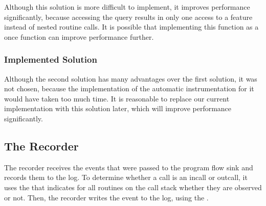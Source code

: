 Although this solution is more difficult to implement, it improves performance significantly, because accessing the query results in only one access to a feature instead of nested routine calls. It is possible that implementing this function as a once function can improve performance further.


\subsubsection {Implemented Solution}
Although the second solution has many advantages over the first solution, it was not chosen, because the implementation of the automatic instrumentation for it would have taken too much time. It is reasonable to replace our current implementation with this solution later, which will improve performance significantly.


\subsection{The Recorder}
The recorder receives the events that were passed to the program flow sink and records them to the log. To determine whether a call is an incall or outcall, it uses the  that indicates for all routines on the call stack whether they are observed or not. Then, the recorder writes the event to the log, using the .


